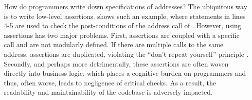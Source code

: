 How do programmers write down specifications of addresses?
The ubiquitous way is to write low-level assertions.
 shows such an example, where  statements in lines 4-5
are used to check the post-conditions of the address call of .
However, using assertions has two major problems. First, assertions are coupled with 
a specific call and are not modularly defined.
If there are multiple calls to the same address, assertions are duplicated,
violating the ``don't repeat yourself'' principle \cite{DBLP:journals/software/X00c}.
Secondly, and perhaps more detrimentally, these assertions are often woven directly into business logic, which places a cognitive burden on programmers and thus, often worse, leads to negligence of critical checks.
As a result, the readability and maintainability of the codebase is adversely impacted.



